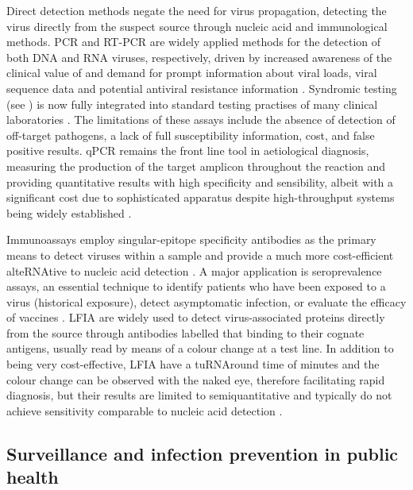 Direct detection methods negate the need for virus propagation, detecting the virus directly from the suspect source through nucleic acid and immunological methods. 
\ac{PCR} and \ac{RT-PCR} are widely applied methods for the detection of both \ac{DNA} and \ac{RNA} viruses, respectively, driven by increased awareness of the clinical value of and demand for prompt information about viral loads, viral sequence data and potential antiviral resistance information \citep{cassedy_virus_2021}. 
Syndromic testing (see ) is now fully integrated into standard testing practises of many clinical laboratories \citep{dien_bard_panels_2020}. 
The limitations of these assays include the absence of detection of off-target pathogens, a lack of full susceptibility information, cost, and false positive results. 
\ac{qPCR} remains the front line tool in aetiological diagnosis, measuring the production of the target amplicon throughout the reaction and providing quantitative results with high specificity and sensibility, albeit with a significant cost due to sophisticated apparatus despite high-throughput systems being widely established \citep{cassedy_virus_2021}.

Immunoassays employ singular-epitope specificity antibodies as the primary means to detect viruses within a sample and provide a much more cost-efficient alte\ac{RNA}tive to nucleic acid detection \citep{cassedy_virus_2021}. 
A major application is seroprevalence assays, an essential technique to identify patients who have been exposed to a virus (historical exposure), detect asymptomatic infection, or evaluate the efficacy of vaccines \citep{chan_determining_2021, bobrovitz_global_2021}. 
\ac{LFIA} are widely used to detect virus-associated proteins directly from the source through antibodies labelled that binding to their cognate antigens, usually read by means of a colour change at a test line. 
In addition to being very cost-effective, \ac{LFIA} have a tu\ac{RNA}round time of minutes and the colour change can be observed with the naked eye, therefore facilitating rapid diagnosis, but their results are limited to semiquantitative and typically do not achieve sensitivity comparable to nucleic acid detection \citep{estrela_lateral_2016, cassedy_virus_2021, di_nardo_ten_2021}.

\subsection{Surveillance and infection prevention in public health} \label{ssec:_intro_survaillance}

